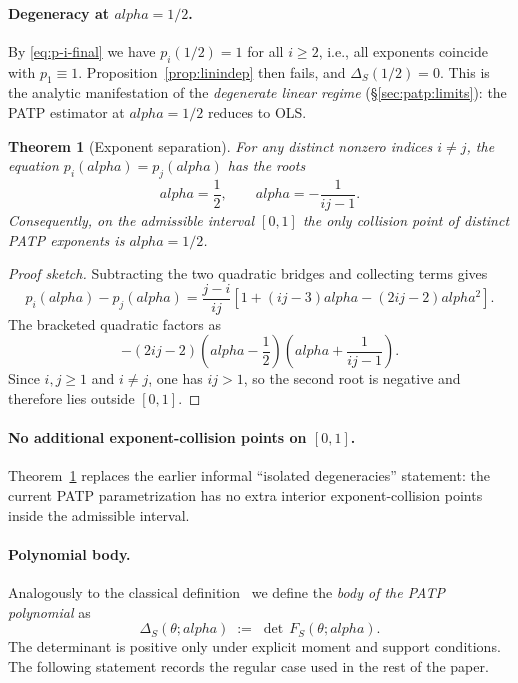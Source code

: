 \documentclass[11pt]{article}
\def\alpha{alpha}%
\def\mathbf#1{#1}%
\def\tfrac#1#2{#1/#2}%
\newtheorem{theorem}{Theorem}[section]
\theoremstyle{definition}
\begin{document}
\paragraph{Degeneracy at $\alpha = \tfrac{1}{2}$.}
By \eqref{eq:p-i-final} we have $p_i(\tfrac{1}{2}) = 1$ for all
$i \geq 2$, i.e., all exponents coincide with $p_1 \equiv 1$.
Proposition~\ref{prop:linindep} then fails, and
$\Delta_S(\tfrac{1}{2}) = 0$. This is the analytic manifestation of the
\emph{degenerate linear regime} (\S\ref{sec:patp:limits}): the PATP
estimator at $\alpha = \tfrac{1}{2}$ reduces to OLS.

\begin{theorem}[Exponent separation]\label{thm:exponent-separation}
For any distinct nonzero indices $i \neq j$, the equation
$p_i(\alpha)=p_j(\alpha)$ has the roots
\[
  \alpha=\frac{1}{2},
  \qquad
  \alpha=-\frac{1}{ij-1}.
\]
Consequently, on the admissible interval $[0,1]$ the only collision point of
distinct PATP exponents is $\alpha=\tfrac{1}{2}$.
\end{theorem}

\begin{proof}[Proof sketch]
Subtracting the two quadratic bridges and collecting terms gives
\[
  p_i(\alpha)-p_j(\alpha)
  =
  \frac{j-i}{ij}
  \left[
    1+(ij-3)\alpha-(2ij-2)\alpha^2
  \right].
\]
The bracketed quadratic factors as
\[
  -(2ij-2)
  \left(\alpha-\frac{1}{2}\right)
  \left(\alpha+\frac{1}{ij-1}\right).
\]
Since $i,j\geq 1$ and $i\neq j$, one has $ij>1$, so the second root is
negative and therefore lies outside $[0,1]$.
\end{proof}

\paragraph{No additional exponent-collision points on $[0,1]$.}
Theorem~\ref{thm:exponent-separation} replaces the earlier informal
``isolated degeneracies'' statement: the current PATP parametrization has no
extra interior exponent-collision points inside the admissible interval.

\paragraph{Polynomial body.}
Analogously to the classical definition~\citep{kunchenko2006stochastic} we
define the \emph{body of the PATP polynomial} as
\begin{equation}\label{eq:body-patp}
  \Delta_S(\theta; \alpha)
  \;:=\; \det\,\mathbf{F}_S(\theta; \alpha).
\end{equation}
The determinant is positive only under explicit moment and support
conditions. The following statement records the regular case used in the
rest of the paper.
\end{document}
